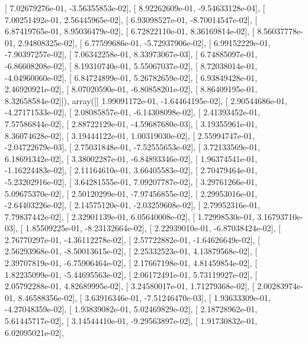 \documentclass{article}
\begin{document}
       [  7.02679276e-01,  -3.56355853e-02],
       [  8.92262609e-01,  -9.54633128e-04],
       [  7.00251492e-01,   2.56445965e-02],
       [  6.93098527e-01,  -8.70014547e-02],
       [  6.87419765e-01,   8.95036479e-02],
       [  6.72822110e-01,   8.36169814e-02],
       [  8.56037778e-01,   2.94808325e-02],
       [  6.77599686e-01,  -5.72937906e-02],
       [  6.99152229e-01,  -7.90397257e-02],
       [  7.06342258e-01,   8.33973067e-03],
       [  6.74885097e-01,  -6.86608208e-02],
       [  8.19310740e-01,   5.55067037e-02],
       [  8.72038014e-01,  -4.04960060e-02],
       [  6.84724899e-01,   5.26782659e-02],
       [  6.93849428e-01,   2.46920921e-02],
       [  8.07020590e-01,  -6.80858201e-02],
       [  8.86409195e-01,   8.32658584e-02]]), array([[  1.99091172e-01,  -1.64464195e-02],
       [  2.90544686e-01,  -4.27171533e-02],
       [  2.08085857e-01,  -6.14308098e-02],
       [  2.41393452e-01,   7.57586844e-02],
       [  2.88722129e-01,  -4.59687680e-03],
       [  3.19355961e-01,   8.36074628e-02],
       [  3.19444122e-01,   1.00319030e-02],
       [  2.55994747e-01,  -2.04722679e-03],
       [  2.75031848e-01,  -7.52555653e-02],
       [  3.72133569e-01,   6.18691342e-02],
       [  3.38002287e-01,  -6.84893346e-02],
       [  1.96374541e-01,  -1.16224483e-02],
       [  2.11164610e-01,   3.66405583e-02],
       [  2.70479464e-01,  -5.23202916e-02],
       [  3.64281555e-01,   7.09207787e-02],
       [  3.29761266e-01,   5.09675370e-02],
       [  2.50120299e-01,  -7.97456855e-02],
       [  2.29953016e-01,  -2.64403226e-02],
       [  2.14575120e-01,  -2.03259608e-02],
       [  2.79952316e-01,   7.79837442e-02],
       [  2.32901139e-01,   6.05640008e-02],
       [  1.72998530e-01,   3.16793710e-03],
       [  1.85509225e-01,  -8.23132664e-02],
       [  2.22939010e-01,  -6.87038424e-02],
       [  2.76770297e-01,  -4.36112278e-02],
       [  2.57722882e-01,  -1.64626649e-02],
       [  2.56293968e-01,  -8.50013615e-02],
       [  2.25332523e-01,   4.13879568e-02],
       [  2.39707819e-01,  -6.75906464e-02],
       [  2.17667198e-01,   4.81459854e-02],
       [  1.82235099e-01,  -5.44695563e-02],
       [  2.06172491e-01,   5.73119927e-02],
       [  2.05792288e-01,   4.82689995e-02],
       [  3.24580017e-01,   1.71279368e-02],
       [  2.00283974e-01,   8.46588356e-02],
       [  3.63916346e-01,  -7.51246470e-03],
       [  1.93633309e-01,  -4.27048359e-02],
       [  1.93839082e-01,   5.02469829e-02],
       [  2.18728962e-01,   5.61445717e-02],
       [  3.14544410e-01,  -9.29563897e-02],
       [  1.91730832e-01,   6.02095021e-02],
\end{document}
